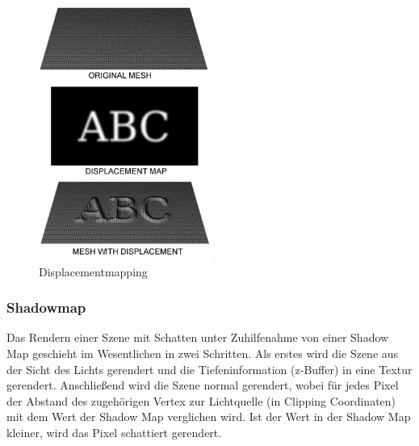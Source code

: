 \begin{figure}[H]
    \centering
    \includegraphics[width=0.5\textwidth]{images/Displacement.jpg}
    \caption{Displacementmapping} %
    \label{fig:displacement-mapping}
\end{figure}



\subsubsection{Shadowmap}
Das Rendern einer Szene mit Schatten unter Zuhilfenahme von einer Shadow Map geschieht im Wesentlichen in zwei Schritten. Als erstes wird die Szene aus der Sicht des Lichts gerendert und die Tiefeninformation (z-Buffer) in eine Textur gerendert. Anschließend wird die Szene normal gerendert, wobei für jedes Pixel  der Abstand des zugehörigen Vertex zur Lichtquelle (in Clipping Coordinaten) mit dem Wert der Shadow Map verglichen wird. Ist der Wert in der Shadow Map kleiner, wird  das Pixel schattiert gerendert.

